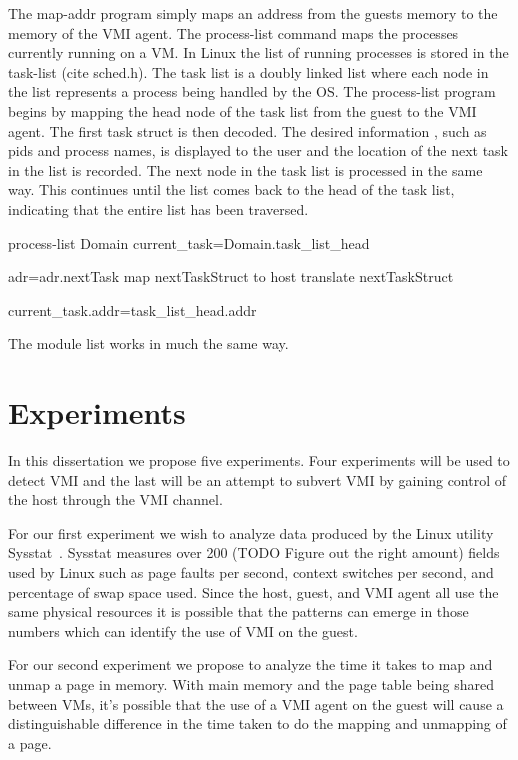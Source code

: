 The map-addr program simply maps an address from the guests memory to the memory of the VMI agent. The process-list command maps the processes currently running on a VM. In Linux the list of running processes is stored in the task-list (cite sched.h). The task list is a doubly linked list where each node in the list represents a process being handled by the OS. The process-list program begins by mapping the head node of the task list from the guest to the VMI agent. The first task struct is then decoded. The desired information , such as pids and process names, is displayed to the user and the location of the next task in the list is recorded. The next node in the task list is processed in the same way. This continues until the list comes back to the head of the task list, indicating that the entire list has been traversed. 

\begin{pseudocode}{process-list}{ Domain}
	current_task=Domain.task\_list\_head
	\REPEAT 

		adr=adr.nextTask
		map nextTaskStruct to host
		translate nextTaskStruct
		
	\UNTIL current\_task.addr=task\_list\_head.addr
\end{pseudocode}


The module list works in much the same way. 


\section{Experiments}
In this dissertation we propose five experiments. Four experiments will be used to detect VMI and the last will be an attempt to subvert VMI by gaining control of the host through the VMI channel. 

For our first experiment we wish to analyze data produced by the Linux utility Sysstat~\cite{godard_sysstat_2010}. Sysstat measures over 200 (TODO Figure out the right amount) fields used by Linux such as page faults per second, context switches per second, and percentage of swap space used. Since the host, guest, and VMI agent all use the same physical resources it is possible that the patterns can emerge in those numbers which can identify the use of VMI on the guest. 

For our second experiment we propose to analyze the time it takes to map and unmap a page in memory. With main memory and the page table being shared between VMs,  it's possible that the use of a VMI agent on the guest will cause a distinguishable difference in the time taken to do the mapping and unmapping of a page.

